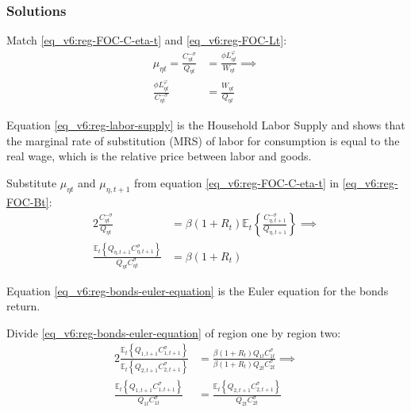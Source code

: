 \documentclass[../thesis.tex]{subfiles}
\begin{document}
\subsubsection*{Solutions}

Match \ref{eq_v6:reg-FOC-C-eta-t} and \ref{eq_v6:reg-FOC-Lt}:
\begin{align}
	\mu_{\eta t} = \frac{ C_{\eta t}^{-\sigma}}{Q_{\eta t}} &= \frac{\phi L_{\eta t}^{\varphi}}{W_{\eta t}} \implies \nonumber \\
	\frac{\phi L_{\eta t}^{\varphi}}{C_{\eta t}^{-\sigma}} &= \frac{W_{\eta t}}{Q_{\eta t}} \label{eq_v6:reg-labor-supply}
\end{align}

Equation \ref{eq_v6:reg-labor-supply} is the Household Labor Supply and shows that the marginal rate of substitution (MRS) of labor for consumption is equal to the real wage, which is the relative price between labor and goods.

Substitute $\mu_{\eta t}$ and $\mu_{\eta, t+1}$ from equation \ref{eq_v6:reg-FOC-C-eta-t} in \ref{eq_v6:reg-FOC-Bt}:
\begin{alignat}{2}
	\frac{C_{\eta t}^{-\sigma}}{Q_{\eta t}} &= \beta (1 + R_{t}) \mathbb{E}_{t} \left\{ \frac{C_{\eta, t+1}^{-\sigma}}{Q_{\eta, t+1}} \right\} \implies \nonumber \\
	\frac{\mathbb{E}_{t} \left\{Q_{\eta, t+1} C_{\eta, t+1}^{\sigma} \right\}}{Q_{\eta t} C_{\eta t}^{\sigma}} &= \beta (1 + R_{t}) \label{eq_v6:reg-bonds-euler-equation}
\end{alignat}

Equation \ref{eq_v6:reg-bonds-euler-equation} is the Euler equation for the bonds return.

Divide \ref{eq_v6:reg-bonds-euler-equation} of region one by region two:
\begin{alignat}{2}
	\frac{\mathbb{E}_{t} \left\{Q_{1, t+1} C_{1, t+1}^{\sigma} \right\}}{\mathbb{E}_{t} \left\{Q_{2, t+1} C_{2, t+1}^{\sigma} \right\}} &= \frac{\beta (1 + R_{t}) Q_{1t} C_{1t}^{\sigma}}{\beta (1 + R_{t}) Q_{2t} C_{2t}^{\sigma}} \implies \nonumber \\
	\frac{\mathbb{E}_{t} \left\{ Q_{1, t+1} C_{1, t+1}^{\sigma} \right\}}{Q_{1t} C_{1t}^{\sigma}} &= \frac{\mathbb{E}_{t} \left\{ Q_{2, t+1} C_{2, t+1}^{\sigma} \right\}}{Q_{2t} C_{2t}^{\sigma}} \label{eq_v6:reg-bonds-euler-equation-2}
\end{alignat}
\end{document}
